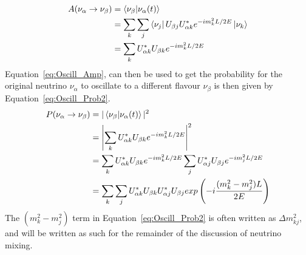 \begin{align}
    A(\nu_{\alpha}\rightarrow\nu_{\beta}) &= \bra{\nu_{\beta}}\ket{\nu_\alpha(t)} \nonumber \\
    &= \sum_{k}\sum_{j}\bra{\nu_{j}}U_{\beta j}U^{\ast}_{\alpha k}e^{-im_{k}^{2}L/2E}\ket{\nu_{k}} \nonumber \\
    &= \sum_{k}U^{\ast}_{\alpha k}U_{\beta k}e^{-im_{k}^{2}L/2E}   \label{eq:Oscill_Amp}
\end{align}
Equation~\ref{eq:Oscill_Amp}, can then be used to get the probability for the original neutrino $\nu_{\alpha}$ to oscillate to a different flavour $\nu_{\beta}$ is then given by Equation~\ref{eq:Oscill_Prob2}.
\begin{align}
  P(\nu_{\alpha}\rightarrow\nu_{\beta}) &= |\bra{\nu_{\beta}}\ket{\nu_\alpha(t)}|^2 \nonumber \\
  &= \left|\sum_{k}U^{\ast}_{\alpha k}U_{\beta k}e^{-im_{k}^{2}L/2E}\right|^2 \label{eq:Oscill_Prob1}\\
  &= \sum_{k}U^{\ast}_{\alpha k}U_{\beta k}e^{-im_{k}^{2}L/2E} \sum_{j}U^{\ast}_{\alpha j}U_{\beta j}e^{-im_{j}^{2}L/2E} \nonumber\\
  &= \sum_{k}\sum_{j}U^{\ast}_{\alpha k}U_{\beta k}U^{\ast}_{\alpha j}U_{\beta j}exp\left(-i\frac{(m^{2}_{k}-m^{2}_{j})L}{2E}\right) \label{eq:Oscill_Prob2}
\end{align}
The $(m^{2}_{k}-m^{2}_{j})$ term in Equation~\ref{eq:Oscill_Prob2} is often written as $\Delta m^{2}_{kj}$, and will be written as such for the remainder of the discussion of neutrino mixing. \\

